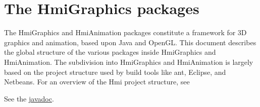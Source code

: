 \ifx \hmigraphicsreportdir \undefinedmacro {} \fi
\ifx \webserver \undefinedmacro \def \webserver{http://elckerlyc.sourceforge.net/javadoc/Hmi/} \fi
\chapter{The HmiGraphics packages}
The HmiGraphics and HmiAnimation packages constitute a framework for 3D graphics and animation, based upon Java and OpenGL.
This document describes the global structure of the various packages inside HmiGraphics and HmiAnimation.
The subdivision into HmiGraphics and HmiAnimation is largely based on the project structure used by build tools
like ant, Eclipse, and Netbeans. For an overview of the Hmi project structure, see \cite{hmiprojectstructure}

See the \href{\webserver}{javadoc}.




%
%


%
%
%
%
